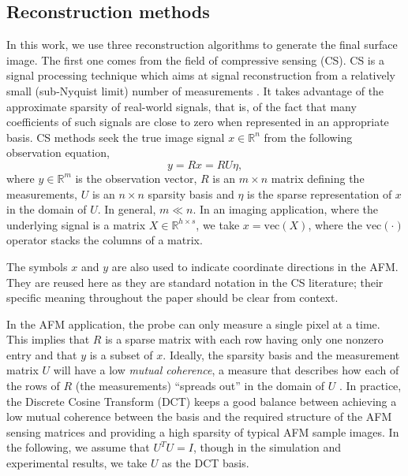 \documentclass[twocolumn,twoside]{IEEEtran/IEEEtran}
\begin{document}
\subsection{Reconstruction methods}
\label{sec:reconstructionMethods}
	
In this work, we use three reconstruction algorithms to generate the final
surface image. The first one comes from the field of compressive sensing (CS).
CS is a signal processing technique which aims at signal reconstruction from a
relatively small (sub-Nyquist limit) number of measurements
\cite{carmi2014compressive}. It takes advantage of the approximate sparsity of
real-world signals, that is, of the fact that many coefficients of such signals
are close to zero when represented in an appropriate basis. CS methods seek the
true image signal $x\in\mathbb{R}^n$ from the following observation equation,
\begin{equation}\label{op:observation}
  y = R x = RU\eta,
\end{equation}
\noindent where $y\in\mathbb{R}^m$ is the observation vector, $R$ is an
$m\times n$ matrix defining the measurements, $U$ is an $n\times n$ sparsity
basis and $\eta$ is the sparse representation of $x$ in the domain of $U$. In
general, $m\ll n$. In an imaging application, where the underlying signal is a
matrix $X\in\mathbb{R}^{h\times s}$, we take $x=\text{vec}(X)$, where the
$\text{vec}(\cdot)$ operator stacks the columns of a matrix.

The symbols $x$ and $y$ are also used to indicate coordinate directions in the AFM.
They are reused here as they are standard notation in the CS literature; their
specific meaning throughout the paper should be clear from context.
	
In the AFM application, the probe can only measure a single pixel at a time.
This implies that $R$ is a sparse matrix with each row having only one
nonzero entry and that $y$ is a subset of $x$. Ideally, the sparsity basis and
the measurement matrix $U$ will have a low \textit{mutual coherence}, a
measure that describes how each of the rows of $R$ (the measurements)
``spreads out'' in the domain of $U$ \cite{candes2007sparsity}. In practice,
the Discrete Cosine Transform (DCT) keeps a good balance between achieving a low
mutual coherence between the basis and the required structure of the AFM sensing
matrices and providing a high sparsity of typical AFM sample images. In the following,
we assume that $U^TU=I$, though in the simulation and experimental results, we take
$U$ as the DCT basis.
	
\end{document}
